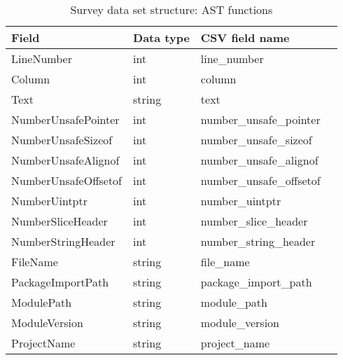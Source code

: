 \begin{table}[h]
    \centering
    \caption{Survey data set structure: AST functions}
    \label{tbl:datastructure-ast-functions}
    \begin{tabular}{llll}
        \toprule
        Field & Data type & CSV field name \\
        \midrule
        LineNumber           & int    & line\_number \\
        Column               & int    & column \\
        Text                 & string & text \\
        NumberUnsafePointer  & int    & number\_unsafe\_pointer \\
        NumberUnsafeSizeof   & int    & number\_unsafe\_sizeof \\
        NumberUnsafeAlignof  & int    & number\_unsafe\_alignof \\
        NumberUnsafeOffsetof & int    & number\_unsafe\_offsetof \\
        NumberUintptr        & int    & number\_uintptr \\
        NumberSliceHeader    & int    & number\_slice\_header \\
        NumberStringHeader   & int    & number\_string\_header \\
        FileName             & string & file\_name \\
        PackageImportPath    & string & package\_import\_path \\
        ModulePath           & string & module\_path \\
        ModuleVersion        & string & module\_version \\
        ProjectName          & string & project\_name \\
        \bottomrule
    \end{tabular}
\end{table}

